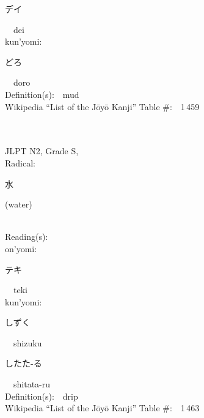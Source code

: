 \begin{multicols}{2}
{\hspace*{2em}}{\begin{CJK}{UTF8}{min} デイ \end{CJK}}\ \ dei\ \ \\
{\hspace*{1em}}kun'yomi:\ \ \\
{\hspace*{2em}}{\begin{CJK}{UTF8}{min} どろ \end{CJK}}\ \ doro\ \ \\
Definition(s):\ \ mud \\
Wikipedia ``List of the J\=oy\=o Kanji'' Table \#:\ \ 1\,459 \\
\ \ \\
{\fontsize{34pt}{40pt}  }\ \ \\  %
{JLPT N2, Grade S, \\Radical:\ \ {\begin{CJK}{UTF8}{min} 水 \end{CJK}} (water) } \\
Reading(s):\ \ \\
{\hspace*{1em}}on'yomi:\ \ \\
{\hspace*{2em}}{\begin{CJK}{UTF8}{min} テキ \end{CJK}}\ \ teki\ \ \\
{\hspace*{1em}}kun'yomi:\ \ \\
{\hspace*{2em}}{\begin{CJK}{UTF8}{min} しずく \end{CJK}}\ \ shizuku\ \ \\
{\hspace*{2em}}{\begin{CJK}{UTF8}{min} したた-る \end{CJK}}\ \ shitata-ru\ \ \\
Definition(s):\ \ drip \\
Wikipedia ``List of the J\=oy\=o Kanji'' Table \#:\ \ 1\,463 \\
\ \ \\
{\fontsize{34pt}{40pt}  }\ \ \\  %

\end{multicols}
